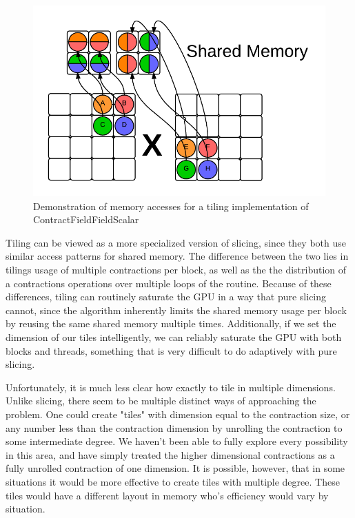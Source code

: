 \begin{figure}
    \centering
    \includegraphics[scale = .7]{ContractFieldFieldScalarGraphicTiling2}
    \caption{Demonstration of memory accesses for a tiling implementation of ContractFieldFieldScalar}
\end{figure}

	Tiling can be viewed as a more specialized version of slicing, since they both use similar access patterns for shared memory. The difference between the two lies in tilings usage of multiple contractions per block, as well as the the distribution of a contractions operations over multiple loops of the routine. Because of these differences, tiling can routinely saturate the GPU in a way that pure slicing cannot, since the algorithm inherently limits the shared memory usage per block by reusing the same shared memory multiple times. Additionally, if we set the dimension of our tiles intelligently, we can reliably saturate the GPU with both blocks and threads, something that is very difficult to do adaptively with pure slicing. 
	
	Unfortunately, it is much less clear how exactly to tile in multiple dimensions. Unlike slicing, there seem to be multiple distinct ways of approaching the problem. One could create "tiles" with dimension equal to the contraction size, or any number less than the contraction dimension by unrolling the contraction to some intermediate degree. We haven't been able to fully explore every possibility in this area, and have simply treated the higher dimensional contractions as a fully unrolled contraction of one dimension. It is possible, however, that in some situations it would be more effective to create tiles with multiple degree. These tiles would have a different layout in memory who's efficiency would vary by situation. 
	
